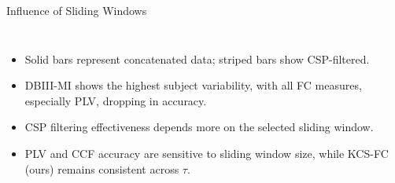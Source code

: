 \documentclass[aspectratio=169]{beamer}
\DeclareRobustCommand{\legend}[1]{%
	\textcolor{#1}{\rule{1ex}{2ex}}%
}
\begin{document}
\begin{frame}{Influence of Sliding Windows}
\begin{columns}
            \begin{itemize}
                \item Solid bars represent concatenated data; striped bars show CSP-filtered.
                \item DBIII-MI shows the highest subject variability, with all FC measures, especially PLV, dropping in accuracy.
                \item CSP filtering effectiveness depends more on the selected sliding window.
                \item PLV and CCF accuracy are sensitive to sliding window size, while KCS-FC (ours) remains consistent across $\tau$.
            \end{itemize}
    \end{columns}
\end{frame}
\end{document}
